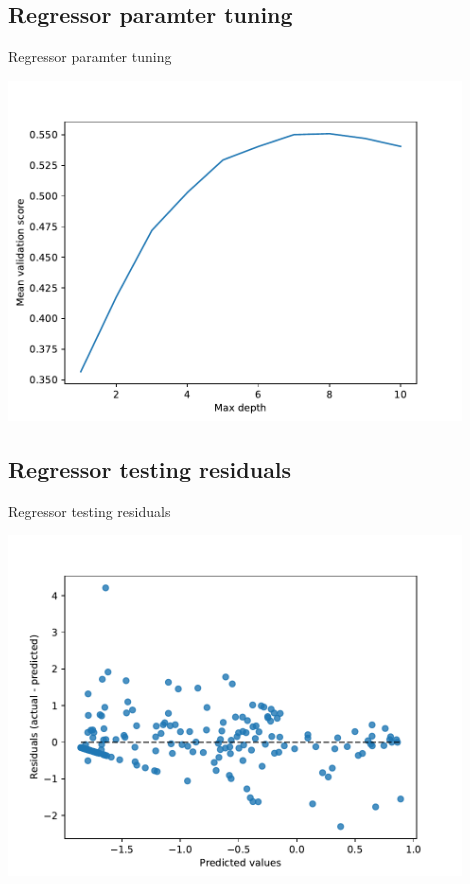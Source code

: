 \documentclass{beamer}
\begin{document}
\subsection{Regressor paramter tuning}
\begin{frame}{Regressor paramter tuning}

\includegraphics[width=0.9\textwidth]{../outputs/forest_regressor_validation.pdf}
    
\end{frame}
    

\subsection{Regressor testing residuals}
\begin{frame}{Regressor testing residuals}

\includegraphics[width=0.9\textwidth]{../outputs/test_regression_plot.pdf}
    
\end{frame}
    
\end{document}
